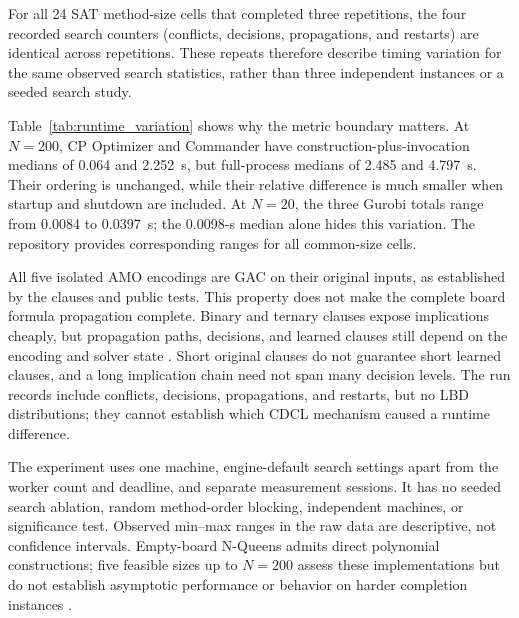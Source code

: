 \documentclass[a4paper,fleqn]{cas-sc}
\begin{document}
\begin{table}[htbp]
\centering
\small
\caption{Selected SAT search counters and median construction plus invocation times from the recorded sessions}
\label{tab:search_statistics}

\end{table}

For all 24 SAT method-size cells that completed three repetitions, the four recorded search counters (conflicts, decisions, propagations, and restarts) are identical across repetitions. These repeats therefore describe timing variation for the same observed search statistics, rather than three independent instances or a seeded search study.

\begin{table}[htbp]
\centering
\small
\caption{Selected runtime ranges over three repetitions (s). Min, median, and max refer to construction plus invocation; the final column includes the full child-process lifecycle}
\label{tab:runtime_variation}

\end{table}

Table~\ref{tab:runtime_variation} shows why the metric boundary matters. At $N=200$, CP Optimizer and Commander have construction-plus-invocation medians of 0.064 and 2.252~s, but full-process medians of 2.485 and 4.797~s. Their ordering is unchanged, while their relative difference is much smaller when startup and shutdown are included. At $N=20$, the three Gurobi totals range from 0.0084 to 0.0397~s; the 0.0098-s median alone hides this variation. The repository provides corresponding ranges for all common-size cells.

All five isolated AMO encodings are GAC on their original inputs, as established by the clauses and public tests. This property does not make the complete board formula propagation complete. Binary and ternary clauses expose implications cheaply, but propagation paths, decisions, and learned clauses still depend on the encoding and solver state \cite{marques2009cdcl,audemard2009predicting}. Short original clauses do not guarantee short learned clauses, and a long implication chain need not span many decision levels. The run records include conflicts, decisions, propagations, and restarts, but no LBD distributions; they cannot establish which CDCL mechanism caused a runtime difference.

The experiment uses one machine, engine-default search settings apart from the worker count and deadline, and separate measurement sessions. It has no seeded search ablation, random method-order blocking, independent machines, or significance test. Observed min--max ranges in the raw data are descriptive, not confidence intervals. Empty-board N-Queens admits direct polynomial constructions; five feasible sizes up to $N=200$ assess these implementations but do not establish asymptotic performance or behavior on harder completion instances \cite{gent2017complexity}.
\end{document}
